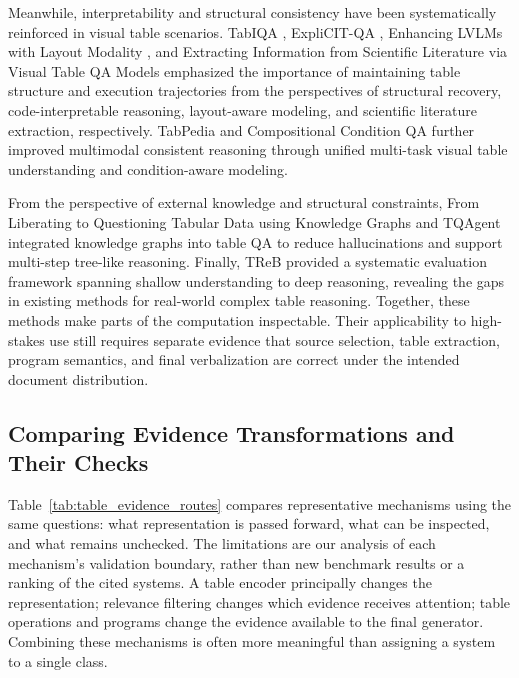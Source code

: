 Meanwhile, interpretability and structural consistency have been systematically reinforced in visual table scenarios. TabIQA \cite{nguyen2023tabiqa}, ExpliCIT-QA \cite{hormazabal2025explicit}, Enhancing LVLMs with Layout Modality \cite{aida2025enhancing}, and Extracting Information from Scientific Literature via Visual Table QA Models \cite{kim2024extracting} emphasized the importance of maintaining table structure and execution trajectories from the perspectives of structural recovery, code-interpretable reasoning, layout-aware modeling, and scientific literature extraction, respectively. TabPedia \cite{zhao2024tabpedia} and Compositional Condition QA \cite{jiangcompositional} further improved multimodal consistent reasoning through unified multi-task visual table understanding and condition-aware modeling.

From the perspective of external knowledge and structural constraints, From Liberating to Questioning Tabular Data using Knowledge Graphs \cite{raj2024liberating} and TQAgent \cite{zhao2025tqagent} integrated knowledge graphs into table QA to reduce hallucinations and support multi-step tree-like reasoning. Finally, TReB \cite{li2025treb} provided a systematic evaluation framework spanning shallow understanding to deep reasoning, revealing the gaps in existing methods for real-world complex table reasoning. Together, these methods make parts of the computation inspectable. Their applicability to high-stakes use still requires separate evidence that source selection, table extraction, program semantics, and final verbalization are correct under the intended document distribution.

\subsection{Comparing Evidence Transformations and Their Checks}

Table~\ref{tab:table_evidence_routes} compares representative mechanisms using the same questions: what representation is passed forward, what can be inspected, and what remains unchecked. The limitations are our analysis of each mechanism's validation boundary, rather than new benchmark results or a ranking of the cited systems. A table encoder principally changes the representation; relevance filtering changes which evidence receives attention; table operations and programs change the evidence available to the final generator. Combining these mechanisms is often more meaningful than assigning a system to a single class.

